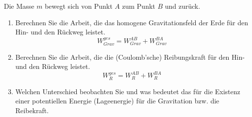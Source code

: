 \begin{ExerciseBlock}
Die Masse $m$ bewegt sich von Punkt $A$ zum Punkt $B$ und zurück.

\begin{center}
\end{center}

\begin{enumerate}
	\item Berechnen Sie die Arbeit, die das homogene Gravitationsfeld der Erde für den Hin- und den Rückweg leistet. \[ W_{Grav}^{ges} = W_{Grav}^{AB} + W_{Grav}^{BA} \]

	\item Berechnen Sie die Arbeit, die die (Coulomb'sche) Reibungskraft für den Hin- und den Rückweg leistet. \[ W_{R}^{ges} = W_{R}^{AB} + W_{R}^{BA} \]

	\item Welchen Unterschied beobachten Sie und was bedeutet das für die Existenz einer potentiellen Energie (Lageenergie) für die Gravitation bzw. die Reibekraft.

\end{enumerate}
\end{ExerciseBlock}
